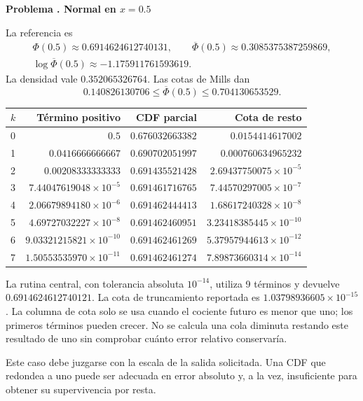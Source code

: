\documentclass[11pt,a4paper]{article}
\theoremstyle{definition}
\newcommand{\Q}{\overline\Phi}
\newcounter{problema}
\newenvironment{resuelto}[1]{\refstepcounter{problema}\par\medskip\Needspace{6\baselineskip}\textbf{Problema \theproblema. #1}\par}{\par\medskip}
\begin{document}
\begin{resuelto}{Normal en $x=0.5$}
La referencia es
\[
\begin{gathered}
\Phi(0.5)\approx0.6914624612740131,\qquad \Q(0.5)\approx0.3085375387259869,\\
\log\Q(0.5)\approx-1.175911761593619.
\end{gathered}
\]
La densidad vale $0.352065326764$. Las cotas de Mills dan
\[
0.140826130706\le\Q(0.5)\le0.704130653529.
\]

\begin{center}\small\begin{tabular}{lrrr}
\toprule
$k$ & Término positivo & CDF parcial & Cota de resto\\\midrule
0 & $0.5$ & $0.676032663382$ & $0.0154414617002$\\
1 & $0.0416666666667$ & $0.690702051997$ & $0.000760634965232$\\
2 & $0.00208333333333$ & $0.691435521428$ & $2.69437750075\times10^{-5}$\\
3 & $7.44047619048\times10^{-5}$ & $0.691461716765$ & $7.44570297005\times10^{-7}$\\
4 & $2.06679894180\times10^{-6}$ & $0.691462444413$ & $1.68617240328\times10^{-8}$\\
5 & $4.69727032227\times10^{-8}$ & $0.691462460951$ & $3.23418385445\times10^{-10}$\\
6 & $9.03321215821\times10^{-10}$ & $0.691462461269$ & $5.37957944613\times10^{-12}$\\
7 & $1.50553535970\times10^{-11}$ & $0.691462461274$ & $7.89873660314\times10^{-14}$\\
\bottomrule\end{tabular}\end{center}

La rutina central, con tolerancia absoluta $10^{-14}$, utiliza 9 términos y devuelve $0.6914624612740121$. La cota de truncamiento reportada es $1.03798936605\times10^{-15}$. La columna de cota solo se usa cuando el cociente futuro es menor que uno; los primeros términos pueden crecer.
No se calcula una cola diminuta restando este resultado de uno sin comprobar cuánto error relativo conservaría.

Este caso debe juzgarse con la escala de la salida solicitada. Una CDF que redondea a uno puede ser adecuada en error absoluto y, a la vez, insuficiente para obtener su supervivencia por resta.
\end{resuelto}
\end{document}
